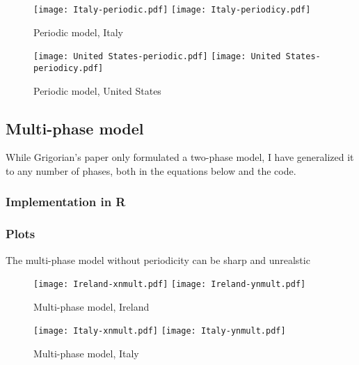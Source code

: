 \begin{figure}[H]
  \texttt{[image: Italy-periodic.pdf]} \label{fig:italy-periodic}
\endminipage\hfill
{}
  \texttt{[image: Italy-periodicy.pdf]} \label{fig:italy-periodicy}
\endminipage
\caption{Periodic model, Italy}
\end{figure}

\begin{figure}[H]
  \texttt{[image: United States-periodic.pdf]} \label{fig:usa-periodic}
\endminipage\hfill
{}
  \texttt{[image: United States-periodicy.pdf]} \label{fig:usa-periodicy}
\endminipage
\caption{Periodic model, United States}
\end{figure}

\subsection{Multi-phase model}

While Grigorian's paper only formulated a two-phase model, I have generalized it to any number of phases, both in the equations below and the code.




\subsubsection{Implementation in R}

\subsubsection{Plots}

The multi-phase model without periodicity can be sharp and unrealstic

\begin{figure}[H]
  \texttt{[image: Ireland-xnmult.pdf]} \label{fig:ireland-xnmult}
\endminipage\hfill
{}
  \texttt{[image: Ireland-ynmult.pdf]} \label{fig:ireland-ynmult}
\endminipage
\caption{Multi-phase model, Ireland}
\end{figure}

\begin{figure}[H]
  \texttt{[image: Italy-xnmult.pdf]} \label{fig:italy-xnmult}
\endminipage\hfill
{}
  \texttt{[image: Italy-ynmult.pdf]} \label{fig:italy-ynmult}
\endminipage
\caption{Multi-phase model, Italy}
\end{figure}

